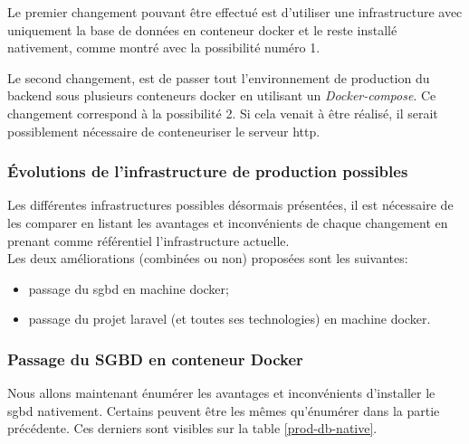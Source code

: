\documentclass[
    iai, %
    il, %
]{heig-tb}
\begin{document}
Le premier changement pouvant être effectué est d'utiliser une infrastructure avec uniquement la base de données en \Gls{conteneur} \Gls{docker} et le reste installé nativement, comme montré avec la possibilité numéro 1.

Le second changement, est de passer tout l'environnement de production du \Gls{backend} sous plusieurs \Gls{conteneur}s \Gls{docker} en utilisant un \emph{Docker-compose}. Ce changement correspond à la possibilité 2. Si cela venait à être réalisé, il serait possiblement nécessaire de conteneuriser le serveur \Gls{http}.

\subsubsection{Évolutions de l'infrastructure de production possibles}
Les différentes infrastructures possibles désormais présentées, il est nécessaire de les comparer en listant les avantages et inconvénients de chaque changement en prenant comme référentiel l'infrastructure actuelle.\\
Les deux améliorations (combinées ou non) proposées sont les suivantes:
\begin{itemize}
    \item passage du \Gls{sgbd} en machine \Gls{docker};
    \item passage du projet \Gls{laravel} (et toutes ses technologies) en machine \Gls{docker}.
\end{itemize}

\subsubsection{Passage du SGBD en conteneur Docker}
Nous allons maintenant énumérer les avantages et inconvénients d'installer le \Gls{sgbd} nativement.
Certains peuvent être les mêmes qu'énumérer dans la partie précédente. Ces derniers sont visibles sur la table \ref{prod-db-native}.
\end{document}

